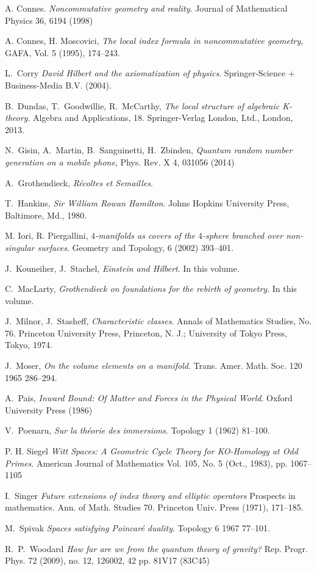 \documentclass[12pt]{article}
\begin{document}
\begin{thebibliography}{99}
  A. Connes. {\em Noncommutative geometry and reality}.  Journal of Mathematical Physics 36, 6194 (1998)

   A. Connes, H. Moscovici, {\em
 The local index formula in noncommutative
geometry},  GAFA, Vol. 5 (1995), 174--243.

 L.~Corry {\em David Hilbert and the axiomatization of physics}. Springer-Science + Business-Media B.V. (2004).



 B.~Dundas, T.~Goodwillie, R.~McCarthy,  {\em The local structure of algebraic K-theory}. Algebra and Applications, 18. Springer-Verlag London, Ltd., London, 2013.

 N.~Gisin, A.~Martin, B.~Sanguinetti,  H.~Zbinden,  {\em Quantum random number generation on a mobile phone}, Phys. Rev. X 4, 031056 (2014)

 A.~Grothendieck, {\em R\' ecoltes et Semailles}. 

 T.~Hankins,   {\em  Sir William Rowan Hamilton}. Johns Hopkins University Press, Baltimore, Md., 1980. 

 M. Iori, R. Piergallini, {\em $4$-manifolds as covers of the
$4$-sphere branched over non-singular surfaces}.
Geometry and Topology, 6 (2002) 393--401.

 J.~Kouneiher,  J.~Stachel, {\em Einstein and Hilbert}. In this volume.



 C.~MacLarty, {\em Grothendieck on foundations for the rebirth of geometry}. In this volume.

 J.~Milnor, J.~Stasheff, {\em Characteristic classes}. Annals of Mathematics Studies, No. 76. Princeton University Press, Princeton, N. J.; University of Tokyo Press, Tokyo, 1974.

 J.~Moser, {\em On the volume elements on a manifold}. Trans. Amer. Math. Soc. 120 1965 286--294.

 A.~Pais, {\em Inward Bound: Of Matter and Forces in the Physical World}.
Oxford University Press (1986)

 V.~Poenaru, {\em Sur la th\' eorie  des immersions}. Topology 1 (1962) 81--100.

 P. H. Siegel
{\em Witt Spaces: A Geometric Cycle Theory for KO-Homology at Odd Primes}.
American Journal of Mathematics
Vol. 105, No. 5 (Oct., 1983), pp. 1067--1105

 I.~Singer  {\em Future extensions of index theory and elliptic operators} Prospects in mathematics. Ann. of Math. Studies 70. Princeton Univ. Press (1971), 171--185.

 M.~Spivak {\em Spaces satisfying Poincar\' e duality}. Topology 6 1967 77--101. 

 R.~P.~Woodard {\em How far are we from the quantum theory of gravity?} Rep. Progr. Phys. 72 (2009), no. 12, 126002, 42 pp. 81V17 (83C45)


\end{thebibliography}
\end{document}
